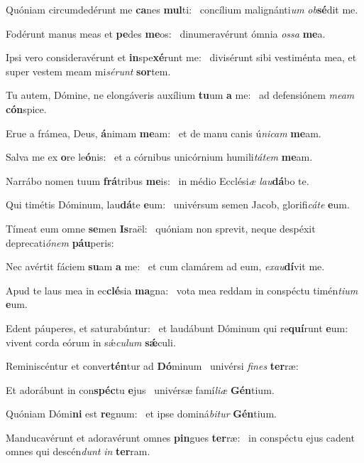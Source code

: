 \item Quóniam circumdedérunt me \textbf{ca}nes \textbf{mul}ti:~\psstar{} concílium malignánti\textit{um} \textit{ob}\textbf{sé}dit me.
\item Fodérunt manus meas et \textbf{pe}des \textbf{me}os:~\psstar{} dinumeravérunt ómnia \textit{ossa} \textbf{me}a.
\item Ipsi vero consideravérunt et \textbf{in}spe\textbf{xé}runt me:~\psstar{} divisérunt sibi vestiménta mea, et super vestem meam mi\textit{sérunt} \textbf{sor}tem.
\item Tu autem, Dómine, ne elongáveris auxílium \textbf{tu}um \textbf{a} me:~\psstar{} ad defensiónem \textit{meam} \textbf{cón}spice.
\item Erue a frámea, Deus, \textbf{á}nimam \textbf{me}am:~\psstar{} et de manu canis ú\textit{nicam} \textbf{me}am.
\item Salva me ex \textbf{o}re le\textbf{ó}nis:~\psstar{} et a córnibus unicórnium humili\textit{tátem} \textbf{me}am.
\item Narrábo nomen tuum \textbf{frá}tribus \textbf{me}is:~\psstar{} in médio Ecclési\textit{æ} \textit{lau}\textbf{dá}bo te.
\item Qui timétis Dóminum, lau\textbf{dá}te \textbf{e}um:~\psstar{} univérsum semen Jacob, glorifi\textit{cáte} \textbf{e}um.
\item Tímeat eum omne \textbf{se}men \textbf{Is}raël:~\psstar{} quóniam non sprevit, neque despéxit deprecati\textit{ónem} \textbf{páu}peris:
\item Nec avértit fáciem \textbf{su}am \textbf{a} me:~\psstar{} et cum clamárem ad eum, \textit{exau}\textbf{dí}vit me.
\item Apud te laus mea in ec\textbf{clé}sia \textbf{ma}gna:~\psstar{} vota mea reddam in conspéctu timén\textit{tium} \textbf{e}um.
\item Edent páuperes, et saturabúntur:~\pscross{} et laudábunt Dóminum qui re\textbf{quí}runt \textbf{e}um:~\psstar{} vivent corda eórum in sǽ\textit{culum} \textbf{sǽ}culi.
\item Reminiscéntur et conver\textbf{tén}tur ad \textbf{Dó}minum~\psstar{} univérsi \textit{fines} \textbf{ter}ræ:
\item Et adorábunt in con\textbf{spéc}tu \textbf{e}jus~\psstar{} univérsæ famí\textit{liæ} \textbf{Gén}tium.
\item Quóniam Dómi\textbf{ni} est \textbf{re}gnum:~\psstar{} et ipse dominá\textit{bitur} \textbf{Gén}tium.
\item Manducavérunt et adoravérunt omnes \textbf{pin}gues \textbf{ter}ræ:~\psstar{} in conspéctu ejus cadent omnes qui descén\textit{dunt} \textit{in} \textbf{ter}ram.
